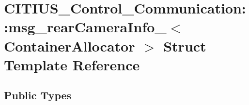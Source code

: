 \hypertarget{struct_c_i_t_i_u_s___control___communication_1_1msg__rear_camera_info__}{\section{\-C\-I\-T\-I\-U\-S\-\_\-\-Control\-\_\-\-Communication\-:\-:msg\-\_\-rear\-Camera\-Info\-\_\-$<$ \-Container\-Allocator $>$ \-Struct \-Template \-Reference}
\label{struct_c_i_t_i_u_s___control___communication_1_1msg__rear_camera_info__}
}
\subsection*{\-Public \-Types}
